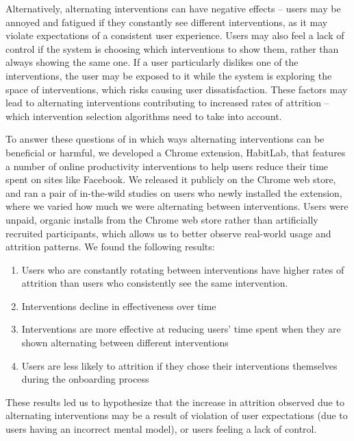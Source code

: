 
Alternatively, alternating interventions can have negative effects -- users may be annoyed and fatigued if they constantly see different interventions, as it may violate expectations of a consistent user experience. Users may also feel a lack of control if the system is choosing which interventions to show them, rather than always showing the same one. If a user particularly dislikes one of the interventions, the user may be exposed to it while the system is exploring the space of interventions, which risks causing user dissatisfaction. These factors may lead to alternating interventions contributing to increased rates of attrition -- which intervention selection algorithms need to take into account.

To answer these questions of in which ways alternating interventions can be beneficial or harmful, we developed a Chrome extension, HabitLab, that features a number of online productivity interventions to help users reduce their time spent on sites like Facebook. We released it publicly on the Chrome web store, and ran a pair of in-the-wild studies on users who newly installed the extension, where we varied how much we were alternating between interventions. Users were unpaid, organic installs from the Chrome web store rather than artificially recruited participants, which allows us to better observe real-world usage and attrition patterns. We found the following results:

\begin{enumerate}
\item Users who are constantly rotating between interventions have higher rates of attrition than users who consistently see the same intervention.
\item Interventions decline in effectiveness over time
\item Interventions are more effective at reducing users' time spent when they are shown alternating between different interventions
\item Users are less likely to attrition if they chose their interventions themselves during the onboarding process
\end{enumerate}

These results led us to hypothesize that the increase in attrition observed due to alternating interventions may be a result of violation of user expectations (due to users having an incorrect mental model), or users feeling a lack of control.

